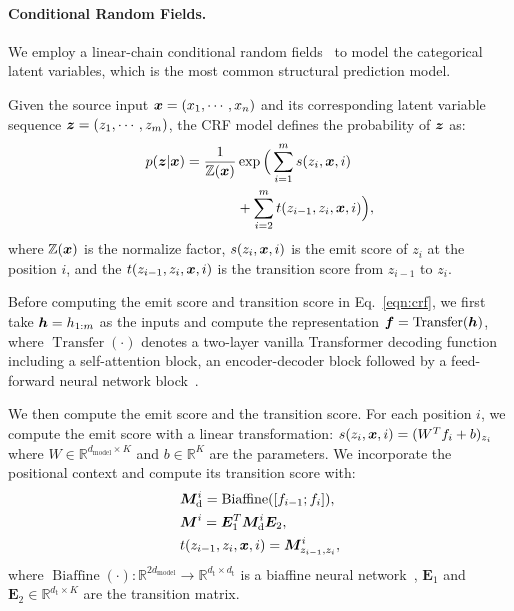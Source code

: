 \paragraph{Conditional Random Fields.}
We employ a linear-chain conditional random fields~\cite[CRF,][]{crf} to model the categorical latent variables, which is the most common structural prediction model.

Given the source input $\bm x=(x_1,\cdots,x_n)$ and its corresponding latent variable sequence $\bm z=(z_1,\cdots,z_m)$, the CRF model defines the probability of $\bm z$ as:
\begin{equation}\begin{split}
    p(\bm z|\bm x)=\frac{1}{\mathbb{Z}(\bm x)}&\operatorname{exp}\Big(\sum_{i=1}^{m}s(z_i,\bm x,i) \\ 
    &+\sum_{i=2}^{m}t(z_{i-1},z_i,\bm x,i) \Big), 
    \label{eqn:crf}
\end{split}
\end{equation}
where $\mathbb{Z}(\bm x)$ is the normalize factor, $s(z_i,\bm x,i)$ is the emit score of $z_i$ at the position $i$, and the $t(z_{i-1},z_i,\bm x,i)$ is the transition score from $z_{i-1}$ to $z_i$. 

Before computing the emit score and transition score in Eq.~\ref{eqn:crf}, we first take $\bm h=h_{1:m}$ as the inputs and compute the representation $\bm f = \operatorname{Transfer}(\bm h)$, where $\operatorname{Transfer}(\cdot)$ denotes a two-layer vanilla Transformer decoding function including a self-attention block, an encoder-decoder block followed by a feed-forward neural network block~\cite{transformer}.

We then compute the emit score and the transition score. 
For each position $i$, we compute the emit score with a linear transformation: $s(z_i,\bm x,i)=(W^{T}f_{i}+b)_{z_i}$ where $W \in \mathbb{R}^{d_\text{model}\times K}$ and $b \in \mathbb{R}^{K}$ are the parameters. 
We incorporate the positional context and compute its transition score with:
\begin{equation}
    \begin{split}
        &\bm M_\text{d}^{i} = \operatorname{Biaffine}([f_{i-1};f_i]), \\
        &\bm M^{i}  = \bm E_{1}^{T}\bm M_\text{d}^{i}\bm E_2,\\
        &t(z_{i-1},z_i,\bm x,i) =\bm M_{z_{i-1},z_{i}}^{i},
    \end{split}
\end{equation}
where $\operatorname{Biaffine}(\cdot):\mathbb{R}^{2d_\text{model}} \to \mathbb{R}^{d_\text{t}\times d_\text{t}} $ is a biaffine neural network~\cite{biaffine}, $\bm E_1$ and $\bm E_2\in\mathbb{R}^{d_\text{t}\times K}$ are the transition matrix.

